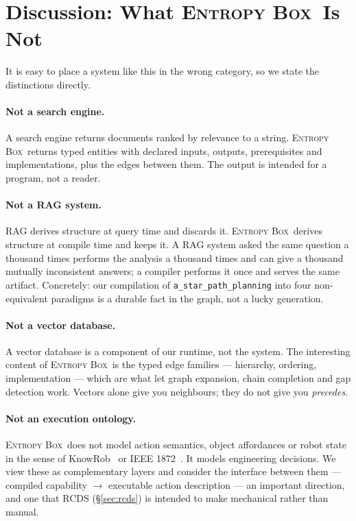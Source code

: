 \documentclass[10pt,a4paper]{article}
\newcommand{\eb}{\textsc{Entropy Box}\xspace}
\begin{document}
\section{Discussion: What \eb\ Is Not}
\label{sec:discussion}

It is easy to place a system like this in the wrong category, so we state the
distinctions directly.

\paragraph{Not a search engine.} A search engine returns documents ranked by
relevance to a string. \eb\ returns typed entities with declared inputs, outputs,
prerequisites and implementations, plus the edges between them. The output is
intended for a program, not a reader.

\paragraph{Not a RAG system.} RAG derives structure at query time and discards
it. \eb\ derives structure at compile time and keeps it. A RAG system asked the
same question a thousand times performs the analysis a thousand times and can
give a thousand mutually inconsistent answers; a compiler performs it once and
serves the same artifact. Concretely: our compilation of
\texttt{a\_star\_path\_planning} into four non-equivalent paradigms is a durable
fact in the graph, not a lucky generation.

\paragraph{Not a vector database.} A vector database is a component of our
runtime, not the system. The interesting content of \eb\ is the typed edge
families --- hierarchy, ordering, implementation --- which are what let graph
expansion, chain completion and gap detection work. Vectors alone give you
neighbours; they do not give you \emph{precedes}.

\paragraph{Not an execution ontology.} \eb\ does not model action semantics,
object affordances or robot state in the sense of KnowRob~\cite{tenorth2013knowrob}
or IEEE 1872~\cite{ieee1872}. It models engineering decisions. We view these as
complementary layers and consider the interface between them --- compiled
capability $\rightarrow$ executable action description --- an important
direction, and one that RCDS (\S\ref{sec:rcds}) is intended to make mechanical
rather than manual.
\end{document}
